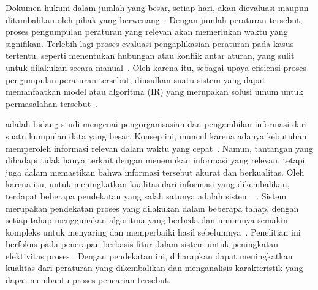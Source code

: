 Dokumen hukum dalam jumlah yang besar, setiap hari, akan dievaluasi maupun ditambahkan oleh pihak yang berwenang~\citep{kim2024legal}. Dengan jumlah peraturan tersebut, proses pengumpulan peraturan yang relevan akan memerlukan waktu yang signifikan. Terlebih lagi proses evaluasi pengaplikasian peraturan pada kasus tertentu, seperti menentukan hubungan atau konflik antar aturan, yang sulit untuk dilakukan secara manual~\citep{kim2024legal}. Oleh karena itu, sebagai upaya efisiensi proses pengumpulan peraturan tersebut, diusulkan suatu sistem yang dapat memanfaatkan model atau algoritma \ir{} (IR) yang merupakan solusi umum untuk permasalahan tersebut~\citep{goebel2023summary, katz2023natural, kim2024legal, nguyen2024enhancing}.

\ir{} adalah bidang studi mengenai pengorganisasian dan pengambilan informasi dari suatu kumpulan data yang besar. Konsep ini, muncul karena adanya kebutuhan memperoleh informasi relevan dalam waktu yang cepat~\citep{sanderson2012history}. Namun, tantangan yang dihadapi tidak hanya terkait dengan menemukan informasi yang relevan, tetapi juga dalam memastikan bahwa informasi tersebut akurat dan berkualitas. Oleh karena itu, untuk meningkatkan kualitas dari informasi yang dikembalikan, terdapat beberapa pendekatan yang salah satunya adalah sistem \cascaded{} \ir{}~\citep{wang2011cascade}. Sistem \cascaded{} \ir{} merupakan pendekatan proses \retrieval{} yang dilakukan dalam beberapa tahap, dengan setiap tahap menggunakan algoritma yang berbeda dan umumnya semakin kompleks untuk menyaring dan memperbaiki hasil sebelumnya~\citep{zhan2020learning}. Penelitian ini berfokus pada penerapan \reranker{} berbasis fitur dalam sistem \cascaded{} \ir{} untuk peningkatan efektivitas proses \retrieval{}. Dengan pendekatan ini, diharapkan dapat meningkatkan kualitas dari peraturan yang dikembalikan dan menganalisis karakteristik yang dapat membantu proses pencarian tersebut.





